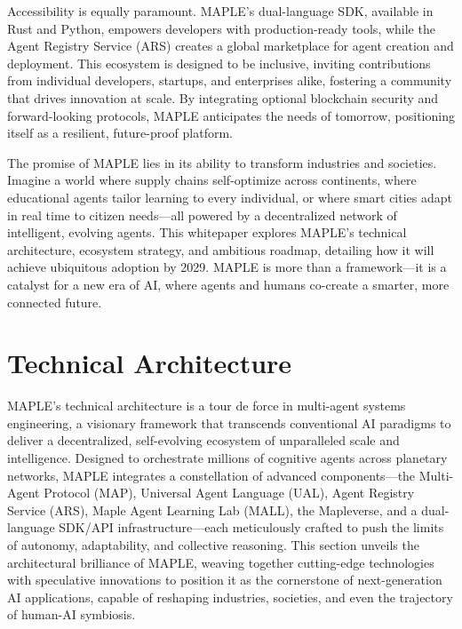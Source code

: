 \documentclass[a4paper,11pt]{article}
\begin{document}
Accessibility is equally paramount. MAPLE’s dual-language SDK, available in Rust and Python, empowers developers with production-ready tools, while the Agent Registry Service (ARS) creates a global marketplace for agent creation and deployment. This ecosystem is designed to be inclusive, inviting contributions from individual developers, startups, and enterprises alike, fostering a community that drives innovation at scale. By integrating optional blockchain security and forward-looking protocols, MAPLE anticipates the needs of tomorrow, positioning itself as a resilient, future-proof platform.

The promise of MAPLE lies in its ability to transform industries and societies. Imagine a world where supply chains self-optimize across continents, where educational agents tailor learning to every individual, or where smart cities adapt in real time to citizen needs—all powered by a decentralized network of intelligent, evolving agents. This whitepaper explores MAPLE’s technical architecture, ecosystem strategy, and ambitious roadmap, detailing how it will achieve ubiquitous adoption by 2029. MAPLE is more than a framework—it is a catalyst for a new era of AI, where agents and humans co-create a smarter, more connected future.

\pagebreak


\section{Technical Architecture}
MAPLE’s technical architecture is a tour de force in multi-agent systems engineering, a visionary framework that transcends conventional AI paradigms to deliver a decentralized, self-evolving ecosystem of unparalleled scale and intelligence. Designed to orchestrate millions of cognitive agents across planetary networks, MAPLE integrates a constellation of advanced components—the Multi-Agent Protocol (MAP), Universal Agent Language (UAL), Agent Registry Service (ARS), Maple Agent Learning Lab (MALL), the Mapleverse, and a dual-language SDK/API infrastructure—each meticulously crafted to push the limits of autonomy, adaptability, and collective reasoning. This section unveils the architectural brilliance of MAPLE, weaving together cutting-edge technologies with speculative innovations to position it as the cornerstone of next-generation AI applications, capable of reshaping industries, societies, and even the trajectory of human-AI symbiosis.
\end{document}
